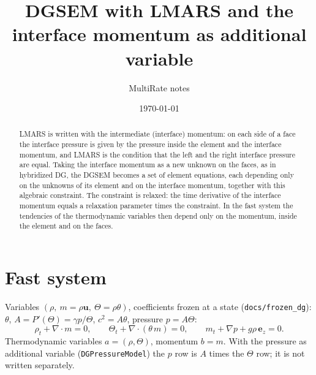 \documentclass[11pt,a4paper]{article}
\title{DGSEM with LMARS and the interface momentum as additional variable}
\author{MultiRate notes}
\date{\today}
\newcommand{\code}[1]{\texttt{#1}}
\begin{document}
\maketitle

\begin{abstract}
LMARS is written with the intermediate (interface) momentum: on each side of a face the interface pressure is given by
the pressure inside the element and the interface momentum, and LMARS is the condition that the left and the right
interface pressure are equal. Taking the interface momentum as a new unknown on the faces, as in hybridized DG, the
DGSEM becomes a set of element equations, each depending only on the unknowns of its element and on the interface
momentum, together with this algebraic constraint. The constraint is relaxed: the time derivative of the interface
momentum equals a relaxation parameter times the constraint. In the fast system the tendencies of the thermodynamic
variables then depend only on the momentum, inside the element and on the faces.
\end{abstract}

\section{Fast system}
Variables $(\rho,\ m=\rho\mathbf u,\ \Theta=\rho\theta)$, coefficients frozen at a state (\code{docs/frozen\_dg}): $\theta$, $A=P'(\Theta)=\gamma p/\Theta$,
$c^2=A\theta$, pressure $p=A\Theta$:
\begin{equation}
\rho_t+\nabla\cdot m=0,\qquad \Theta_t+\nabla\cdot(\theta\,m)=0,\qquad m_t+\nabla p+g\rho\,\mathbf e_z=0 .\label{eq:fast}
\end{equation}
Thermodynamic variables $a=(\rho,\Theta)$, momentum $b=m$. With the pressure as additional variable (\code{DGPressureModel}) the
$p$ row is $A$ times the $\Theta$ row; it is not written separately.
\end{document}
